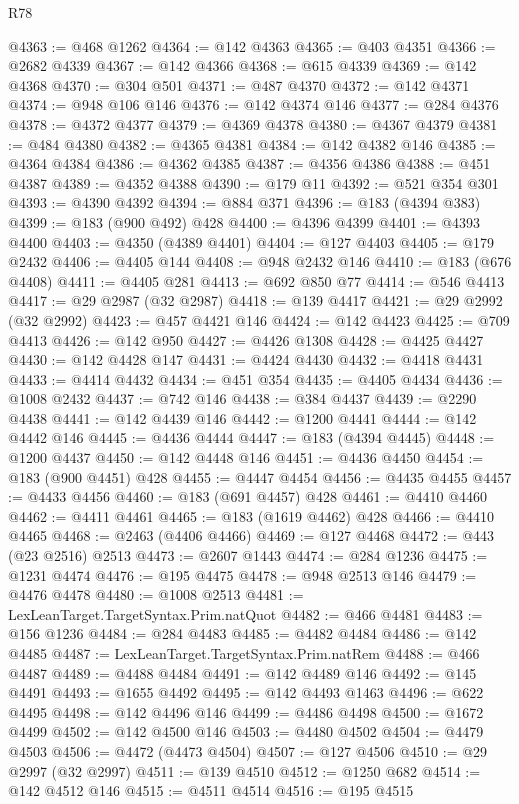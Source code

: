 \begin{lexlean}{R78}
\begin{coremodule}
@4363 := @468 @1262
@4364 := @142 @4363
@4365 := @403 @4351
@4366 := @2682 @4339
@4367 := @142 @4366
@4368 := @615 @4339
@4369 := @142 @4368
@4370 := @304 @501
@4371 := @487 @4370
@4372 := @142 @4371
@4374 := @948 @106 @146
@4376 := @142 @4374 @146
@4377 := @284 @4376
@4378 := @4372 @4377
@4379 := @4369 @4378
@4380 := @4367 @4379
@4381 := @484 @4380
@4382 := @4365 @4381
@4384 := @142 @4382 @146
@4385 := @4364 @4384
@4386 := @4362 @4385
@4387 := @4356 @4386
@4388 := @451 @4387
@4389 := @4352 @4388
@4390 := @179 @11
@4392 := @521 @354 @301
@4393 := @4390 @4392
@4394 := @884 @371
@4396 := @183 (@4394 @383)
@4399 := @183 (@900 @492) @428
@4400 := @4396 @4399
@4401 := @4393 @4400
@4403 := @4350 (@4389 @4401)
@4404 := @127 @4403
@4405 := @179 @2432
@4406 := @4405 @144
@4408 := @948 @2432 @146
@4410 := @183 (@676 @4408)
@4411 := @4405 @281
@4413 := @692 @850 @77
@4414 := @546 @4413
@4417 := @29 @2987 (@32 @2987)
@4418 := @139 @4417
@4421 := @29 @2992 (@32 @2992)
@4423 := @457 @4421 @146
@4424 := @142 @4423
@4425 := @709 @4413
@4426 := @142 @950
@4427 := @4426 @1308
@4428 := @4425 @4427
@4430 := @142 @4428 @147
@4431 := @4424 @4430
@4432 := @4418 @4431
@4433 := @4414 @4432
@4434 := @451 @354
@4435 := @4405 @4434
@4436 := @1008 @2432
@4437 := @742 @146
@4438 := @384 @4437
@4439 := @2290 @4438
@4441 := @142 @4439 @146
@4442 := @1200 @4441
@4444 := @142 @4442 @146
@4445 := @4436 @4444
@4447 := @183 (@4394 @4445)
@4448 := @1200 @4437
@4450 := @142 @4448 @146
@4451 := @4436 @4450
@4454 := @183 (@900 @4451) @428
@4455 := @4447 @4454
@4456 := @4435 @4455
@4457 := @4433 @4456
@4460 := @183 (@691 @4457) @428
@4461 := @4410 @4460
@4462 := @4411 @4461
@4465 := @183 (@1619 @4462) @428
@4466 := @4410 @4465
@4468 := @2463 (@4406 @4466)
@4469 := @127 @4468
@4472 := @443 (@23 @2516) @2513
@4473 := @2607 @1443
@4474 := @284 @1236
@4475 := @1231 @4474
@4476 := @195 @4475
@4478 := @948 @2513 @146
@4479 := @4476 @4478
@4480 := @1008 @2513
@4481 := LexLeanTarget.TargetSyntax.Prim.natQuot
@4482 := @466 @4481
@4483 := @156 @1236
@4484 := @284 @4483
@4485 := @4482 @4484
@4486 := @142 @4485
@4487 := LexLeanTarget.TargetSyntax.Prim.natRem
@4488 := @466 @4487
@4489 := @4488 @4484
@4491 := @142 @4489 @146
@4492 := @145 @4491
@4493 := @1655 @4492
@4495 := @142 @4493 @1463
@4496 := @622 @4495
@4498 := @142 @4496 @146
@4499 := @4486 @4498
@4500 := @1672 @4499
@4502 := @142 @4500 @146
@4503 := @4480 @4502
@4504 := @4479 @4503
@4506 := @4472 (@4473 @4504)
@4507 := @127 @4506
@4510 := @29 @2997 (@32 @2997)
@4511 := @139 @4510
@4512 := @1250 @682
@4514 := @142 @4512 @146
@4515 := @4511 @4514
@4516 := @195 @4515

\end{coremodule}
\end{lexlean}
